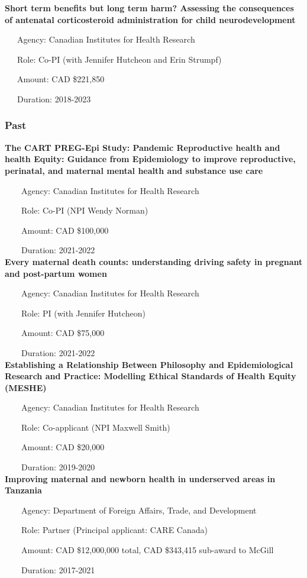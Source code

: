 \documentclass[
  letterpaper,
  DIV=11,
  numbers=noendperiod]{scrartcl}
\begin{document}
\textbf{Short term benefits but long term harm? Assessing the
consequences of antenatal corticosteroid administration for child
neurodevelopment}\\
\strut ~~~Agency: Canadian Institutes for Health Research\\
\strut ~~~Role: Co-PI (with Jennifer Hutcheon and Erin Strumpf)\\
\strut ~~~Amount: CAD \$221,850\\
\strut ~~~Duration: 2018-2023\\

\subsubsection{Past}\label{past-1}

\textbf{The CART PREG-Epi Study: Pandemic Reproductive health and health
Equity: Guidance from Epidemiology to improve reproductive, perinatal,
and maternal mental health and substance use care}\\
\strut ~~~~Agency: Canadian Institutes for Health Research\\
\strut ~~~~Role: Co-PI (NPI Wendy Norman)\\
\strut ~~~~Amount: CAD \$100,000\\
\strut ~~~~Duration: 2021-2022\\

\textbf{Every maternal death counts: understanding driving safety in
pregnant and post-partum women}\\
\strut ~~~~Agency: Canadian Institutes for Health Research\\
\strut ~~~~Role: PI (with Jennifer Hutcheon)\\
\strut ~~~~Amount: CAD \$75,000\\
\strut ~~~~Duration: 2021-2022\\

\textbf{Establishing a Relationship Between Philosophy and
Epidemiological Research and Practice: Modelling Ethical Standards of
Health Equity (MESHE)}\\
\strut ~~~~Agency: Canadian Institutes for Health Research\\
\strut ~~~~Role: Co-applicant (NPI Maxwell Smith)\\
\strut ~~~~Amount: CAD \$20,000\\
\strut ~~~~Duration: 2019-2020\\

\textbf{Improving maternal and newborn health in underserved areas in
Tanzania}\\
\strut ~~~~Agency: Department of Foreign Affairs, Trade, and
Development\\
\strut ~~~~Role: Partner (Principal applicant: CARE Canada)\\
\strut ~~~~Amount: CAD \$12,000,000 total, CAD \$343,415 sub-award to
McGill\\
\strut ~~~~Duration: 2017-2021\\
\end{document}
